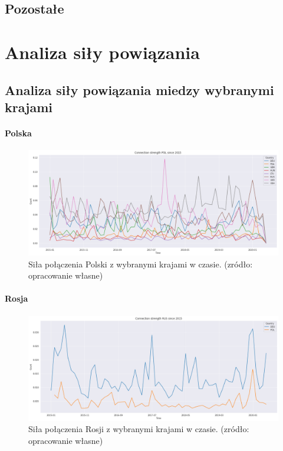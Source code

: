 \documentclass[11pt]{report}
\begin{document}
    \subsection{Pozostałe}


    \section{Analiza siły powiązania}

    \subsection{Analiza siły powiązania miedzy wybranymi krajami}

    \paragraph{Polska}

    \begin{figure}[ht]
        \centering
        \includegraphics[width=1 \textwidth]{fig/PL/POLConnection.png}
        \caption{Siła połączenia Polski z wybranymi krajami w czasie. (zródło: opracowanie własne)}
        \label{fig:PLConnection}
    \end{figure}

    \paragraph{Rosja}

    \begin{figure}[ht]
        \centering
        \includegraphics[width=1 \textwidth]{fig/RUS/RUSConnection.png}
        \caption{Siła połączenia Rosji z wybranymi krajami w czasie. (zródło: opracowanie własne)}
        \label{fig:RUSConnection}
    \end{figure}
\end{document}
